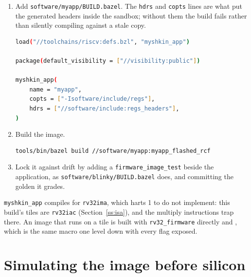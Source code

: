 \documentclass[11pt,pdftex,openany,letterpaper]{report}
\begin{document}
\begin{enumerate}[itemsep=1pt]
\begin{lstlisting}[language=C]
    for (;;) {
        uart0_putc('.');
        GPIO2_REGS->PxOUTT = 0x01;
    }
    return 0;
}
\end{lstlisting}
	The block struct carries the template spelling of the register, not the instance spelling: the instance is in the pointer, so \texttt{UART0\_REGS->UARTxCR} is 's control register. The boot ROM leaves the clock system in a state of its own (Section~\ref{ss:bootmode}), which is why the first write selects the SMCLK source before the baud divider is programmed. The  pad is already at its alternate function after reset (Table~\ref{t:gpio-pins}), so the program configures no pin for the UART and only the GPIO pad it drives itself.
	\item Add \texttt{software/myapp/BUILD.bazel}. The \texttt{hdrs} and \texttt{copts} lines are what put the generated headers inside the sandbox; without them the build fails rather than silently compiling against a stale copy.
\begin{lstlisting}[language=bash]
load("//toolchains/riscv:defs.bzl", "myshkin_app")

package(default_visibility = ["//visibility:public"])

myshkin_app(
    name = "myapp",
    copts = ["-Isoftware/include/regs"],
    hdrs = ["//software/include:regs_headers"],
)
\end{lstlisting}
	\item Build the image.
\begin{lstlisting}[language=bash]
tools/bin/bazel build //software/myapp:myapp_flashed_rcf
\end{lstlisting}
	\item Lock it against drift by adding a \texttt{firmware\_image\_test} beside the application, as \texttt{software/blinky/BUILD.bazel} does, and committing the golden it grades.
\end{enumerate}

\noindent \texttt{myshkin\_app} compiles for \texttt{rv32ima}, which harts 1 to \MaxHartIndex{} do not implement: this build's tiles are \texttt{rv32iac} (Section~\ref{ss:isa}), and the multiply instructions trap there. An image that runs on a tile is built with \texttt{rv32\_firmware} directly and , which is the same macro one level down with every flag exposed.

\section{Simulating the image before silicon} \label{ss:swsim}
\end{document}
